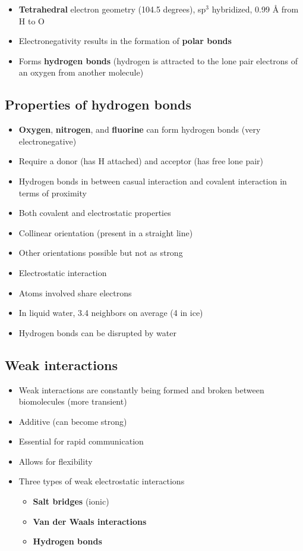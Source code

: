 \documentclass[letterpaper, 12pt]{article}
\begin{document}
\begin{itemize}
\item \textbf{Tetrahedral} electron geometry (104.5 degrees),  sp$^3$ hybridized, 0.99 Å from H to O
\item Electronegativity results in the formation of \textbf{polar bonds}
\item Forms \textbf{hydrogen bonds} (hydrogen is attracted to the lone pair electrons of an oxygen from another molecule)
\end{itemize}

\subsection*{Properties of hydrogen bonds}

\begin{itemize}
\item \textbf{Oxygen}, \textbf{nitrogen}, and \textbf{fluorine} can form hydrogen bonds (very electronegative)
\item Require a donor (has H attached) and acceptor (has free lone pair)
\item Hydrogen bonds in between casual interaction and covalent interaction in terms of proximity
\item Both covalent and electrostatic properties
\item Collinear orientation (present in a straight line)
\item Other orientations possible but not as strong
\item Electrostatic interaction
\item Atoms involved share electrons
\item In liquid water, 3.4 neighbors on average (4 in ice)
\item Hydrogen bonds can be disrupted by water
\end{itemize}

\subsection*{Weak interactions}

\begin{itemize}
\item Weak interactions are constantly being formed and broken between biomolecules (more transient)
\item Additive (can become strong)
\item Essential for rapid communication
\item Allows for flexibility
\item Three types of weak electrostatic interactions
\begin{itemize}
\item \textbf{Salt bridges} (ionic)
\item \textbf{Van der Waals interactions}
\item \textbf{Hydrogen bonds}
\end{itemize}
\end{itemize}
\end{document}
